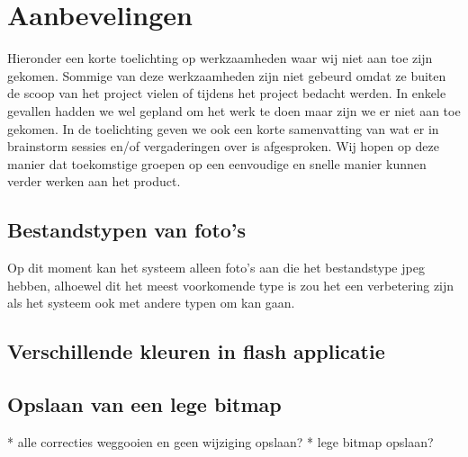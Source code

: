 \section{Aanbevelingen}
\label{Aanbevelingen}
Hieronder een korte toelichting op werkzaamheden waar wij niet aan toe zijn gekomen. Sommige van deze werkzaamheden zijn niet gebeurd omdat ze buiten de scoop van het project vielen of tijdens het project bedacht werden. In enkele gevallen hadden we wel gepland om het werk te doen maar zijn we er niet aan toe gekomen.  In de toelichting geven we ook een korte samenvatting van wat er in brainstorm sessies en/of vergaderingen over is afgesproken. Wij hopen op deze manier dat toekomstige groepen op een eenvoudige en snelle manier kunnen verder werken aan het product.

\subsection{Bestandstypen van foto's}
Op dit moment kan het systeem alleen foto's aan die het bestandstype jpeg hebben, alhoewel dit het meest voorkomende type is zou het een verbetering zijn als het systeem ook met andere typen om kan gaan.

\subsection{Verschillende kleuren in flash applicatie}

\subsection{Opslaan van een lege bitmap}
* alle correcties weggooien en geen wijziging opslaan?
* lege bitmap opslaan?
